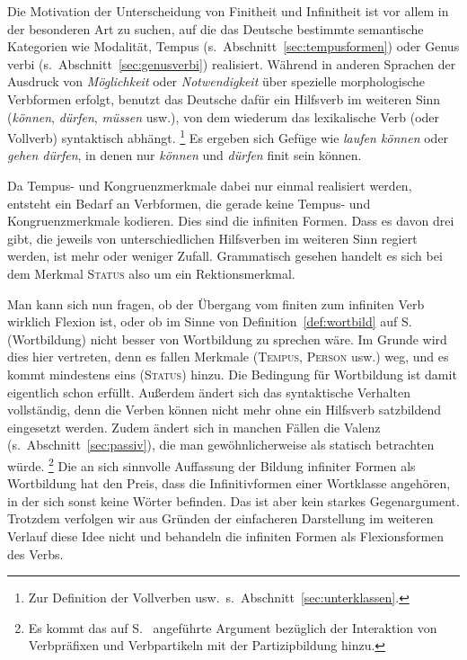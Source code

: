\begin{exe}
\end{exe}

Die Motivation der Unterscheidung von Finitheit und Infinitheit ist vor allem in der besonderen Art zu suchen, auf die das Deutsche bestimmte semantische Kategorien wie Modalität, Tempus (s.\ Abschnitt~\ref{sec:tempusformen}) oder Genus verbi (s.\ Abschnitt~\ref{sec:genusverbi}) realisiert.
Während in anderen Sprachen \zB der Ausdruck von \textit{Möglichkeit} oder \textit{Notwendigkeit} über spezielle morphologische Verbformen erfolgt, benutzt das Deutsche dafür ein Hilfsverb im weiteren Sinn (\textit{können}, \textit{dürfen}, \textit{müssen} usw.), von dem wiederum das lexikalische Verb (oder Vollverb) syntaktisch abhängt.%
\footnote{Zur Definition der Vollverben usw.\ s.\ Abschnitt~\ref{sec:unterklassen}.}
Es ergeben sich Gefüge wie \textit{laufen können} oder \textit{gehen dürfen}, in denen nur \textit{können} und \textit{dürfen} finit sein können.

Da Tempus- und Kongruenzmerkmale dabei nur einmal realisiert werden, entsteht ein Bedarf an Verbformen, die gerade keine Tempus- und Kongruenzmerkmale kodieren.
Dies sind die infiniten Formen.
Dass es davon drei gibt, die jeweils von unterschiedlichen Hilfsverben im weiteren Sinn regiert werden, ist mehr oder weniger Zufall.
Grammatisch gesehen handelt es sich bei dem Merkmal \textsc{Status} also um ein Rektionsmerkmal.

\label{abs:finitheitundinfinitheit063}Man kann sich nun fragen, ob der Übergang vom finiten zum infiniten Verb wirklich Flexion ist, oder ob im Sinne von Definition~\ref{def:wortbild} auf S.~\pageref{def:wortbild} (Wortbildung) nicht besser von Wortbildung zu sprechen wäre.
Im Grunde wird dies hier vertreten, denn es fallen Merkmale (\textsc{Tempus}, \textsc{Person} usw.) weg, und es kommt mindestens eins (\textsc{Status}) hinzu.
Die Bedingung für Wortbildung ist damit eigentlich schon erfüllt.
Außerdem ändert sich das syntaktische Verhalten vollständig, denn die Verben können nicht mehr ohne ein Hilfsverb satzbildend eingesetzt werden.
Zudem ändert sich in manchen Fällen die Valenz (s.\ Abschnitt~\ref{sec:passiv}), die man gewöhnlicherweise als statisch betrachten würde.%
\footnote{Es kommt das auf S.~\pageref{abs:derivationohnewortklassenwechsel033} angeführte Argument bezüglich der Interaktion von Verbpräfixen und Verbpartikeln mit der Partizipbildung hinzu.}
Die an sich sinnvolle Auffassung der Bildung infiniter Formen als Wortbildung hat den Preis, dass die Infinitivformen einer Wortklasse angehören, in der sich sonst keine Wörter befinden.
Das ist aber kein starkes Gegenargument.
Trotzdem verfolgen wir aus Gründen der einfacheren Darstellung im weiteren Verlauf diese Idee nicht und behandeln die infiniten Formen als Flexionsformen des Verbs.

